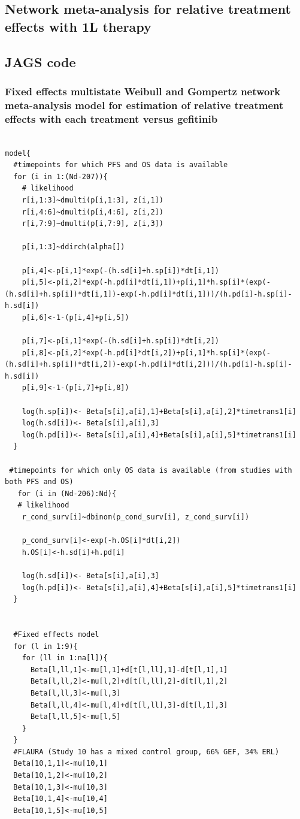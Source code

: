 \documentclass[11pt,final,fleqn]{article}\usepackage[]{graphicx}\usepackage[]{color}
\theoremstyle{plain}
\begin{document}
\begin{appendices}
\section{Network meta-analysis for relative treatment effects with 1L therapy}
\subsection{JAGS code}

\subsubsection{Fixed effects multistate Weibull and Gompertz network meta-analysis model for estimation of relative treatment effects with each treatment versus gefitinib} 

\begin{verbatim} 

model{
  #timepoints for which PFS and OS data is available
  for (i in 1:(Nd-207)){
    # likelihood
    r[i,1:3]~dmulti(p[i,1:3], z[i,1]) 
    r[i,4:6]~dmulti(p[i,4:6], z[i,2]) 
    r[i,7:9]~dmulti(p[i,7:9], z[i,3]) 
    
    p[i,1:3]~ddirch(alpha[])
    
    p[i,4]<-p[i,1]*exp(-(h.sd[i]+h.sp[i])*dt[i,1])
    p[i,5]<-p[i,2]*exp(-h.pd[i]*dt[i,1])+p[i,1]*h.sp[i]*(exp(-(h.sd[i]+h.sp[i])*dt[i,1])-exp(-h.pd[i]*dt[i,1]))/(h.pd[i]-h.sp[i]-h.sd[i])
    p[i,6]<-1-(p[i,4]+p[i,5])
    
    p[i,7]<-p[i,1]*exp(-(h.sd[i]+h.sp[i])*dt[i,2])
    p[i,8]<-p[i,2]*exp(-h.pd[i]*dt[i,2])+p[i,1]*h.sp[i]*(exp(-(h.sd[i]+h.sp[i])*dt[i,2])-exp(-h.pd[i]*dt[i,2]))/(h.pd[i]-h.sp[i]-h.sd[i])
    p[i,9]<-1-(p[i,7]+p[i,8])
    
    log(h.sp[i])<- Beta[s[i],a[i],1]+Beta[s[i],a[i],2]*timetrans1[i] 
    log(h.sd[i])<- Beta[s[i],a[i],3] 
    log(h.pd[i])<- Beta[s[i],a[i],4]+Beta[s[i],a[i],5]*timetrans1[i]
  }
  
 #timepoints for which only OS data is available (from studies with both PFS and OS)
   for (i in (Nd-206):Nd){
   # likelihood
    r_cond_surv[i]~dbinom(p_cond_surv[i], z_cond_surv[i]) 
    
    p_cond_surv[i]<-exp(-h.OS[i]*dt[i,2])
    h.OS[i]<-h.sd[i]+h.pd[i]
    
    log(h.sd[i])<- Beta[s[i],a[i],3] 
    log(h.pd[i])<- Beta[s[i],a[i],4]+Beta[s[i],a[i],5]*timetrans1[i]
  }
    
 
  #Fixed effects model
  for (l in 1:9){
    for (ll in 1:na[l]){
      Beta[l,ll,1]<-mu[l,1]+d[t[l,ll],1]-d[t[l,1],1]
      Beta[l,ll,2]<-mu[l,2]+d[t[l,ll],2]-d[t[l,1],2]
      Beta[l,ll,3]<-mu[l,3]
      Beta[l,ll,4]<-mu[l,4]+d[t[l,ll],3]-d[t[l,1],3]
      Beta[l,ll,5]<-mu[l,5]
    }
  }
  #FLAURA (Study 10 has a mixed control group, 66% GEF, 34% ERL)
  Beta[10,1,1]<-mu[10,1]
  Beta[10,1,2]<-mu[10,2]
  Beta[10,1,3]<-mu[10,3]
  Beta[10,1,4]<-mu[10,4]
  Beta[10,1,5]<-mu[10,5]
  

\end{verbatim}
\end{appendices}
\end{document}
